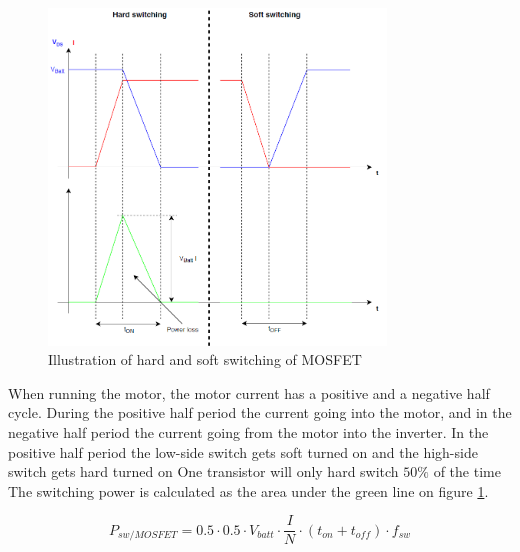     \begin{figure}[H]
		\centering
		\includegraphics[width=0.8\textwidth]{pictures/hardware/Power_Board/Hard_soft_switching.PNG}
		\caption{Illustration of hard and soft switching of MOSFET}
		\label{fig:HardSoftSwitch}
	\end{figure} 

When running the motor, the motor current has a positive and a negative half cycle. During the positive half period the current going into the motor, and in the negative half period the current going from the motor into the inverter. In the positive half period the low-side switch gets soft turned on and the high-side switch gets hard turned on 
One transistor will only hard switch $50 \%$ of the time 
The switching power is calculated as the area under the green line on figure \ref{fig:HardSoftSwitch}. 

    \begin{equation}
        P_{sw/MOSFET} = 0.5 \cdot 0.5 \cdot V_{batt} \cdot \frac{I}{N} \cdot (t_{on}+t_{off}) \cdot f_{sw}
    \end{equation}



